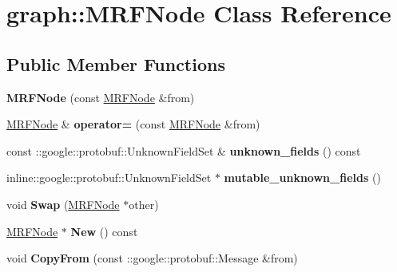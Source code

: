 \hypertarget{classgraph_1_1MRFNode}{
\section{graph::MRFNode Class Reference}
\label{classgraph_1_1MRFNode}
}
\subsection*{Public Member Functions}
\begin{DoxyCompactItemize}
\item 
\hypertarget{classgraph_1_1MRFNode_a021b05b80147363c7e6712f48d44a0a3}{
{\bfseries MRFNode} (const \hyperlink{classgraph_1_1MRFNode}{MRFNode} \&from)}
\label{classgraph_1_1MRFNode_a021b05b80147363c7e6712f48d44a0a3}

\item 
\hypertarget{classgraph_1_1MRFNode_a24e99e7e39879fdb7e5ba3457e05f711}{
\hyperlink{classgraph_1_1MRFNode}{MRFNode} \& {\bfseries operator=} (const \hyperlink{classgraph_1_1MRFNode}{MRFNode} \&from)}
\label{classgraph_1_1MRFNode_a24e99e7e39879fdb7e5ba3457e05f711}

\item 
\hypertarget{classgraph_1_1MRFNode_a8716f067ae2c0b732dbe8e808e58c57f}{
const ::google::protobuf::UnknownFieldSet \& {\bfseries unknown\_\-fields} () const }
\label{classgraph_1_1MRFNode_a8716f067ae2c0b732dbe8e808e58c57f}

\item 
\hypertarget{classgraph_1_1MRFNode_abdd95998aa20cc6e28e69768da470c16}{
inline::google::protobuf::UnknownFieldSet $\ast$ {\bfseries mutable\_\-unknown\_\-fields} ()}
\label{classgraph_1_1MRFNode_abdd95998aa20cc6e28e69768da470c16}

\item 
\hypertarget{classgraph_1_1MRFNode_a6dbf7084428bf6caece3fb82097f1944}{
void {\bfseries Swap} (\hyperlink{classgraph_1_1MRFNode}{MRFNode} $\ast$other)}
\label{classgraph_1_1MRFNode_a6dbf7084428bf6caece3fb82097f1944}

\item 
\hypertarget{classgraph_1_1MRFNode_af2b1e723509a0a3cd88f64d5309dd3d7}{
\hyperlink{classgraph_1_1MRFNode}{MRFNode} $\ast$ {\bfseries New} () const }
\label{classgraph_1_1MRFNode_af2b1e723509a0a3cd88f64d5309dd3d7}

\item 
\hypertarget{classgraph_1_1MRFNode_a9597eb49cdf67bc0fcbdf2fd80df98ee}{
void {\bfseries CopyFrom} (const ::google::protobuf::Message \&from)}
\label{classgraph_1_1MRFNode_a9597eb49cdf67bc0fcbdf2fd80df98ee}


\end{DoxyCompactItemize}
